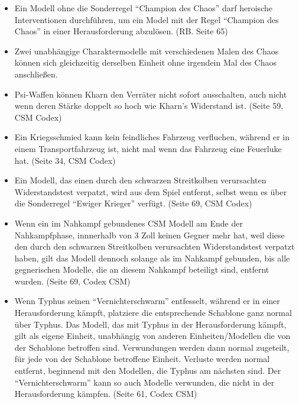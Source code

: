 \begin{itemize}

 \item Ein Modell ohne die Sonderregel ``Champion des Chaos'' darf heroische
  Interventionen durchführen, um ein Model mit der Regel ``Champion des Chaos''
  in einer Herausforderung abzulösen. (RB. Seite 65)

 \item Zwei unabhängige Charaktermodelle mit verschiedenen Malen des Chaos
  können sich gleichzeitig derselben Einheit ohne irgendein Mal des Chaos
  anschließen.

 \item Psi-Waffen können Kharn den Verräter nicht sofort ausschalten, auch nicht
  wenn deren Stärke doppelt so hoch wie Kharn's Widerstand ist. (Seite 59, CSM
  Codex)

 \item Ein Kriegsschmied kann kein feindliches Fahrzeug verfluchen, während er
  in einem Transportfahrzeug ist, nicht mal wenn das Fahrzeug eine Feuerluke
  hat. (Seite 34, CSM Codex)

 \item Ein Modell, das einen durch den schwarzen Streitkolben verursachten
  Widerstandstest verpatzt, wird aus dem Spiel entfernt, selbst wenn es über die
  Sonderregel ``Ewiger Krieger'' verfügt. (Seite 69, CSM Codex)

 \item Wenn ein im Nahkampf gebundenes CSM Modell am Ende der Nahkampfphase,
  innnerhalb von 3 Zoll keinen Gegner mehr hat, weil diese den durch den
  schwarzen Streitkolben verursachten Widerstandstest verpatzt haben, gilt das
  Modell dennoch solange als im Nahkampf gebunden, bis alle gegnerischen
  Modelle, die an diesem Nahkampf beteiligt sind, entfernt wurden. (Seite 69,
  Codex CSM)

 \item Wenn Typhus seinen ``Vernichterschwarm'' entfesselt, während er in einer
  Herausforderung kämpft, platziere die entsprechende Schablone ganz normal über
  Typhus. Das Modell, das mit Typhus in der Herausforderung kämpft, gilt als
  eigene Einheit, unabhängig von anderen Einheiten/Modellen die von der
  Schablone betroffen sind. Verwundungen werden dann normal zugeteilt, für jede
  von der Schablone betroffene Einheit. Verluste werden normal entfernt,
  beginnend mit den Modellen, die Typhus am nächsten sind. Der
  ``Vernichterschwarm'' kann so auch Modelle verwunden, die nicht in der
  Herausforderung kämpfen. (Seite 61, Codex CSM)


\end{itemize}
